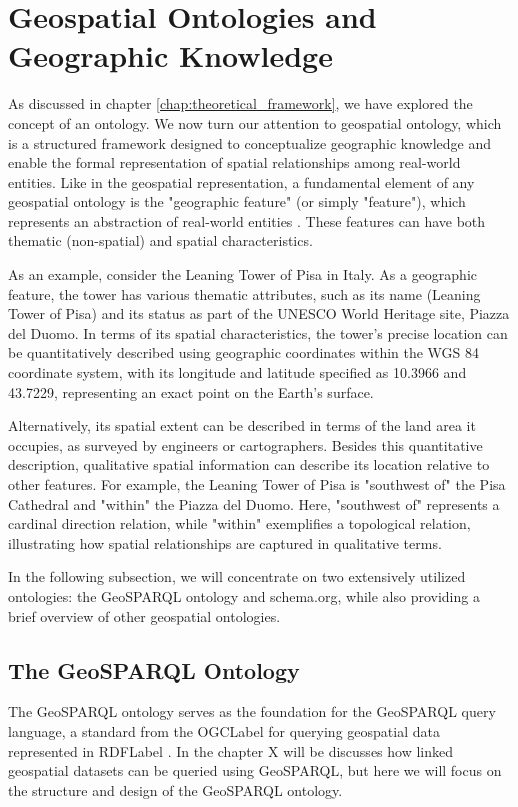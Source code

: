 \section{Geospatial Ontologies and Geographic Knowledge}\label{III-sec:geospatialOntologies}

As discussed in chapter \ref{chap:theoretical_framework}, we have explored the concept of an ontology. We now turn our attention to geospatial ontology, which is a structured framework designed to conceptualize geographic knowledge and enable the formal representation of spatial relationships among real-world entities. Like in the geospatial representation, a fundamental element of any geospatial ontology is the "geographic feature" (or simply "feature"), which represents an abstraction of real-world entities \cite{longleyGeographicInformationScience2015}. These features can have both thematic (non-spatial) and spatial characteristics.

As an example, consider the Leaning Tower of Pisa in Italy. As a geographic feature, the tower has various thematic attributes, such as its name (Leaning Tower of Pisa) and its status as part of the UNESCO World Heritage site, Piazza del Duomo. In terms of its spatial characteristics, the tower’s precise location can be quantitatively described using geographic coordinates within the WGS 84 coordinate system, with its longitude and latitude specified as 10.3966 and 43.7229, representing an exact point on the Earth’s surface.

Alternatively, its spatial extent can be described in terms of the land area it occupies, as surveyed by engineers or cartographers. Besides this quantitative description, qualitative spatial information can describe its location relative to other features. For example, the Leaning Tower of Pisa is "southwest of" the Pisa Cathedral and "within" the Piazza del Duomo. Here, "southwest of" represents a cardinal direction relation, while "within" exemplifies a topological relation, illustrating how spatial relationships are captured in qualitative terms.

In the following subsection, we will concentrate on two extensively utilized ontologies: the GeoSPARQL ontology and schema.org, while also providing a brief overview of other geospatial ontologies.

\subsection{The GeoSPARQL Ontology}\label{III-subsec:geosparql}
The GeoSPARQL ontology serves as the foundation for the GeoSPARQL query language, a standard from the \acrfull{OGCLabel} for querying geospatial data represented in \acrshort{RDFLabel} \cite{matthewperryOGCGeoSPARQLGeographic2012}. In the chapter X will be discusses how linked geospatial datasets can be queried using GeoSPARQL, but here we will focus on the structure and design of the GeoSPARQL ontology.

